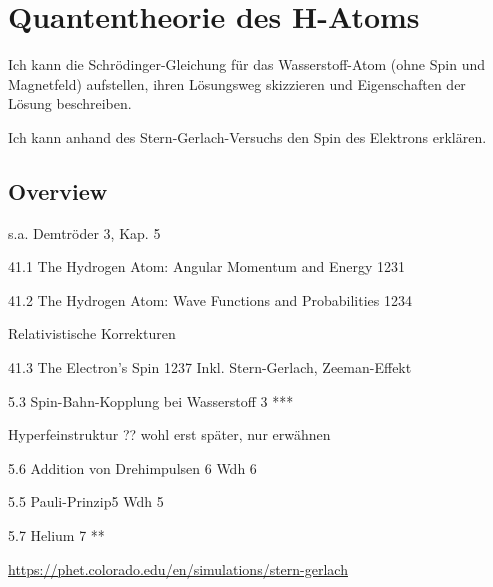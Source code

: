 \renewcommand{\lastmod}{10. September 2024}
\renewcommand{\chapterauthors}{Markus Lippitz}

\chapter{Quantentheorie des H-Atoms}




Ich kann die Schrödinger-Gleichung für das Wasserstoff-Atom (ohne Spin und Magnetfeld) aufstellen, ihren Lösungsweg skizzieren und Eigenschaften der Lösung beschreiben.

Ich kann anhand des Stern-Gerlach-Versuchs den Spin des Elektrons erklären.


\section{Overview}

s.a. Demtröder 3, Kap. 5

41.1 The Hydrogen Atom: Angular Momentum and Energy 1231

41.2 The Hydrogen Atom: Wave Functions and Probabilities 1234

Relativistische Korrekturen

41.3 The Electron's Spin 1237
Inkl. Stern-Gerlach, Zeeman-Effekt

5.3 Spin-Bahn-Kopplung bei Wasserstoff 3	***	

Hyperfeinstruktur ?? wohl erst später, nur erwähnen

5.6 Addition von Drehimpulsen 6	Wdh	6 

5.5 Pauli-Prinzip5	Wdh	5 

5.7 Helium 7	**	


\url{https://phet.colorado.edu/en/simulations/stern-gerlach}







